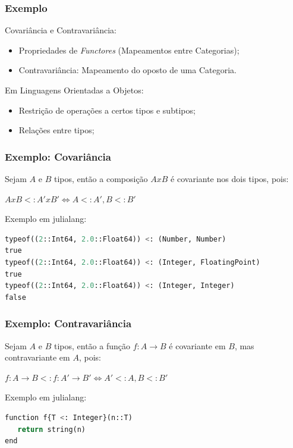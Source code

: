 \documentclass[10pt, compress]{beamer}
\begin{document}
\begin{frame}[fragile]
  \frametitle{Exemplo}
  \begin{block}{Covariância e Contravariância:}
      \begin{itemize}
          \item Propriedades de \emph{Functores} (Mapeamentos entre Categorias);
          \item Contravariância: Mapeamento do oposto de uma Categoria.
      \end{itemize}
  \end{block}
  \pause
  \begin{block}{Em Linguagens Orientadas a Objetos:}
      \begin{itemize}
          \item Restrição de operações a certos tipos e subtipos;
          \item Relações entre tipos;
      \end{itemize}
  \end{block}
\end{frame}

\begin{frame}[fragile]
  \frametitle{Exemplo: Covariância}
  Sejam $A$ e $B$ tipos, então a composição $AxB$ 
  é covariante nos dois tipos, pois:
  
    $AxB <: A'xB' \Leftrightarrow A <: A', B <: B'$
  \pause
  \begin{block}{Exemplo em julialang:}
      \small
      \begin{lstlisting}[language=Python, basicstyle=\ttfamily,keywordstyle=\color{red}]
typeof((2::Int64, 2.0::Float64)) <: (Number, Number)
true
typeof((2::Int64, 2.0::Float64)) <: (Integer, FloatingPoint)
true
typeof((2::Int64, 2.0::Float64)) <: (Integer, Integer)
false
      \end{lstlisting}
  \end{block}
\end{frame}

\begin{frame}[fragile]
  \frametitle{Exemplo: Contravariância}
  Sejam $A$ e $B$ tipos, então a função $f: A \rightarrow B$
  é covariante em $B$, mas contravariante em $A$, pois: 
  
    $f: A \rightarrow B <: f: A' \rightarrow B' \Leftrightarrow A' <: A, B <: B'$
  \pause
  \begin{block}{Exemplo em julialang:}
      \small
      \begin{lstlisting}[language=Python, basicstyle=\ttfamily,keywordstyle=\color{red}]
function f{T <: Integer}(n::T)
   return string(n)
end
      \end{lstlisting}
  \end{block}
\end{frame}
\end{document}
